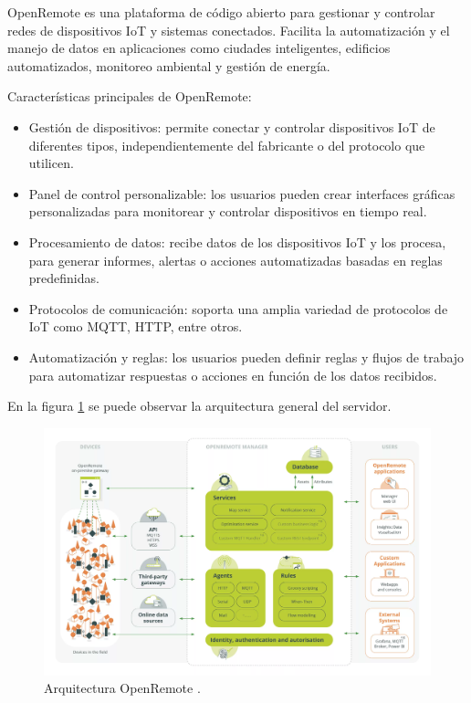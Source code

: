 OpenRemote \citep{openremote} \citep{docsopenremote} es una plataforma de código abierto para gestionar y controlar redes de dispositivos IoT y sistemas conectados. Facilita la automatización y el manejo de datos en aplicaciones como ciudades inteligentes, edificios automatizados, monitoreo ambiental y gestión de energía.

Características principales de OpenRemote:

\begin{itemize}
	\item Gestión de dispositivos: permite conectar y controlar dispositivos IoT de diferentes tipos, independientemente del fabricante o del protocolo que utilicen.
	\item Panel de control personalizable: los usuarios pueden crear interfaces gráficas personalizadas para monitorear y controlar dispositivos en tiempo real.
	\item Procesamiento de datos: recibe datos de los dispositivos IoT y los procesa, para generar informes, alertas o acciones automatizadas basadas en reglas predefinidas.
	\item Protocolos de comunicación: soporta una amplia variedad de protocolos de IoT como MQTT, HTTP, entre otros.
	\item Automatización y reglas: los usuarios pueden definir reglas y flujos de trabajo para automatizar respuestas o acciones en función de los datos recibidos.
\end{itemize}

En la figura \ref{fig:arqopremote} se puede observar la arquitectura general del servidor.

\begin{figure}[H]
    \centering
    \includegraphics[width=1.1\textwidth]{./Figures/arq_or.jpg}
    \caption{Arquitectura OpenRemote \citep{docsopenremote}.}
    \label{fig:arqopremote}
\end{figure}





